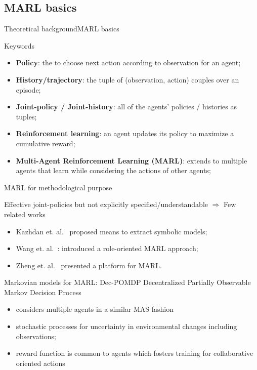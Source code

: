 \subsection{MARL basics}

\begin{frame}[allowframebreaks]{Theoretical background}{MARL basics}

    \begin{block}{Keywords}
        \begin{itemize}
            \item \textbf{Policy}: the  to choose next action according to observation for an agent;
            \item \textbf{History/trajectory}: the tuple of (observation, action) couples over an episode;
            \item \textbf{Joint-policy / Joint-history}: all of the agents' policies / histories as tuples;
            \item \textbf{Reinforcement learning}: an agent updates its policy to maximize a cumulative reward;
            \item \textbf{Multi-Agent Reinforcement Learning (MARL)}: extends to multiple agents that learn while considering the actions of other agents;
        \end{itemize}
    \end{block}

    \begin{block}{MARL for methodological purpose}

        Effective joint-policies but not explicitly specified/understandable
        $\Longrightarrow$ Few related works

        \begin{itemize}
            \item Kazhdan et. al.~\cite{Kazhdan2020} proposed means to extract symbolic models;
            \item Wang et. al.~\cite{Wang2020}: introduced a role-oriented MARL approach;
            \item Zheng et. al.~\cite{Zheng2018} presented a platform for MARL.
        \end{itemize}
    \end{block}

    \begin{block}{Markovian models for MARL: Dec-POMDP}
        Decentralized Partially Observable Markov Decision Process~\cite{Oliehoek2016}
        \begin{itemize}
            \item considers multiple agents in a similar MAS fashion
            \item stochastic processes for uncertainty in environmental changes including observations;
            \item reward function is common to agents which fosters training for collaborative oriented actions~\cite{Beynier2013}
        \end{itemize}


\end{block}
\end{frame}
